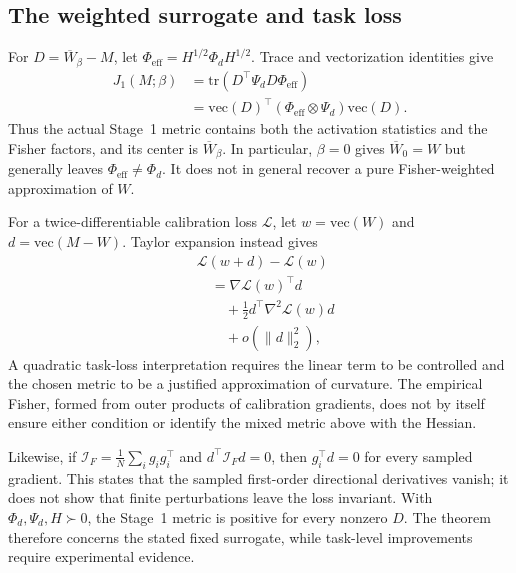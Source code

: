 \subsection{The weighted surrogate and task loss}\label{sup:surrogate-interpretation}

For $D=\overline W_\beta-M$, let $\Phi_{\mathrm{eff}}=H^{1/2}\Phi_d H^{1/2}$. Trace and vectorization identities give
\begin{equation}
\begin{aligned}
J_1(M;\beta)
&=\mathrm{tr}(D^\top\Psi_dD\Phi_{\mathrm{eff}}) \\
&=\mathrm{vec}(D)^\top
(\Phi_{\mathrm{eff}}\otimes\Psi_d)\mathrm{vec}(D).
\end{aligned}
\end{equation}
Thus the actual Stage~1 metric contains both the activation statistics and the Fisher factors, and its center is $\overline W_\beta$. In particular, $\beta=0$ gives $\overline W_0=W$ but generally leaves $\Phi_{\mathrm{eff}}\ne\Phi_d$. It does not in general recover a pure Fisher-weighted approximation of $W$.

For a twice-differentiable calibration loss $\mathcal L$, let $w=\mathrm{vec}(W)$ and $d=\mathrm{vec}(M-W)$. Taylor expansion instead gives
\begin{equation}
\begin{aligned}
&\mathcal L(w+d)-\mathcal L(w)\\
&\quad=\nabla\mathcal L(w)^\top d \\
&\qquad+\tfrac12 d^\top\nabla^2\mathcal L(w)d\\
&\qquad+o(\|d\|_2^2),
\end{aligned}
\end{equation}
A quadratic task-loss interpretation requires the linear term to be controlled and the chosen metric to be a justified approximation of curvature. The empirical Fisher, formed from outer products of calibration gradients, does not by itself ensure either condition or identify the mixed metric above with the Hessian.

Likewise, if $\mathcal I_F=\frac1N\sum_i g_i g_i^\top$ and $d^\top\mathcal I_Fd=0$, then $g_i^\top d=0$ for every sampled gradient. This states that the sampled first-order directional derivatives vanish; it does not show that finite perturbations leave the loss invariant. With $\Phi_d,\Psi_d,H\succ0$, the Stage~1 metric is positive for every nonzero $D$. The theorem therefore concerns the stated fixed surrogate, while task-level improvements require experimental evidence.

